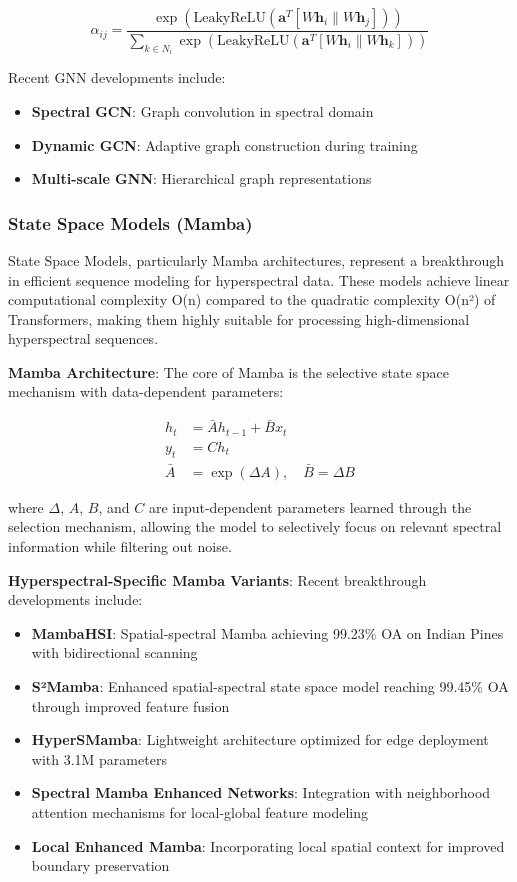 \documentclass[journal]{IEEEtran}
\begin{document}
\begin{equation}
\alpha_{ij} = \frac{\exp(\text{LeakyReLU}(\mathbf{a}^T[W\mathbf{h}_i \| W\mathbf{h}_j]))}{\sum_{k \in N_i} \exp(\text{LeakyReLU}(\mathbf{a}^T[W\mathbf{h}_i \| W\mathbf{h}_k]))}
\end{equation}

Recent GNN developments include:
\begin{itemize}
\item \textbf{Spectral GCN}: Graph convolution in spectral domain
\item \textbf{Dynamic GCN}: Adaptive graph construction during training
\item \textbf{Multi-scale GNN}: Hierarchical graph representations
\end{itemize}

\subsubsection{State Space Models (Mamba)}

State Space Models, particularly Mamba architectures, represent a breakthrough in efficient sequence modeling for hyperspectral data. These models achieve linear computational complexity O(n) compared to the quadratic complexity O(n²) of Transformers, making them highly suitable for processing high-dimensional hyperspectral sequences.

\textbf{Mamba Architecture}: The core of Mamba is the selective state space mechanism with data-dependent parameters:

\begin{align}
h_t &= \bar{A}h_{t-1} + \bar{B}x_t \\
y_t &= Ch_t \\
\bar{A} &= \exp(\Delta A), \quad \bar{B} = \Delta B
\end{align}

where $\Delta$, $A$, $B$, and $C$ are input-dependent parameters learned through the selection mechanism, allowing the model to selectively focus on relevant spectral information while filtering out noise.

\textbf{Hyperspectral-Specific Mamba Variants}: Recent breakthrough developments include:
\begin{itemize}
\item \textbf{MambaHSI}: Spatial-spectral Mamba achieving 99.23\% OA on Indian Pines with bidirectional scanning
\item \textbf{S²Mamba}: Enhanced spatial-spectral state space model reaching 99.45\% OA through improved feature fusion
\item \textbf{HyperSMamba}: Lightweight architecture optimized for edge deployment with 3.1M parameters
\item \textbf{Spectral Mamba Enhanced Networks}: Integration with neighborhood attention mechanisms for local-global feature modeling
\item \textbf{Local Enhanced Mamba}: Incorporating local spatial context for improved boundary preservation
\end{itemize}
\end{document}
